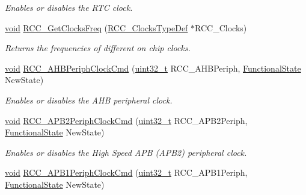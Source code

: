 \begin{DoxyCompactItemize}
\begin{DoxyCompactList}\small\item\em Enables or disables the R\+TC clock. \end{DoxyCompactList}\item 
\hyperlink{usb__devapi_8h_afabf60e7f57651d6d595a02c75f07cd0}{void} \hyperlink{group___r_c_c___exported___functions_ga3e9944fd1ed734275222bbb3e3f29993}{R\+C\+C\+\_\+\+Get\+Clocks\+Freq} (\hyperlink{struct_r_c_c___clocks_type_def}{R\+C\+C\+\_\+\+Clocks\+Type\+Def} $\ast$R\+C\+C\+\_\+\+Clocks)
\begin{DoxyCompactList}\small\item\em Returns the frequencies of different on chip clocks. \end{DoxyCompactList}\item 
\hyperlink{usb__devapi_8h_afabf60e7f57651d6d595a02c75f07cd0}{void} \hyperlink{group___r_c_c___exported___functions_gae0b30d8598b8393bdba9c3fefba3a968}{R\+C\+C\+\_\+\+A\+H\+B\+Periph\+Clock\+Cmd} (\hyperlink{_p_e___types_8h_a33594304e786b158f3fb30289278f5af}{uint32\+\_\+t} R\+C\+C\+\_\+\+A\+H\+B\+Periph, \hyperlink{agilefox_2library_2inc_2stm32f10x__type_8h_ac9a7e9a35d2513ec15c3b537aaa4fba1}{Functional\+State} New\+State)
\begin{DoxyCompactList}\small\item\em Enables or disables the A\+HB peripheral clock. \end{DoxyCompactList}\item 
\hyperlink{usb__devapi_8h_afabf60e7f57651d6d595a02c75f07cd0}{void} \hyperlink{group___r_c_c___exported___functions_ga56ff55caf8d835351916b40dd030bc87}{R\+C\+C\+\_\+\+A\+P\+B2\+Periph\+Clock\+Cmd} (\hyperlink{_p_e___types_8h_a33594304e786b158f3fb30289278f5af}{uint32\+\_\+t} R\+C\+C\+\_\+\+A\+P\+B2\+Periph, \hyperlink{agilefox_2library_2inc_2stm32f10x__type_8h_ac9a7e9a35d2513ec15c3b537aaa4fba1}{Functional\+State} New\+State)
\begin{DoxyCompactList}\small\item\em Enables or disables the High Speed A\+PB (A\+P\+B2) peripheral clock. \end{DoxyCompactList}\item 
\hyperlink{usb__devapi_8h_afabf60e7f57651d6d595a02c75f07cd0}{void} \hyperlink{group___r_c_c___exported___functions_gaee7cc5d73af7fe1986fceff8afd3973e}{R\+C\+C\+\_\+\+A\+P\+B1\+Periph\+Clock\+Cmd} (\hyperlink{_p_e___types_8h_a33594304e786b158f3fb30289278f5af}{uint32\+\_\+t} R\+C\+C\+\_\+\+A\+P\+B1\+Periph, \hyperlink{agilefox_2library_2inc_2stm32f10x__type_8h_ac9a7e9a35d2513ec15c3b537aaa4fba1}{Functional\+State} New\+State)

\end{DoxyCompactItemize}
